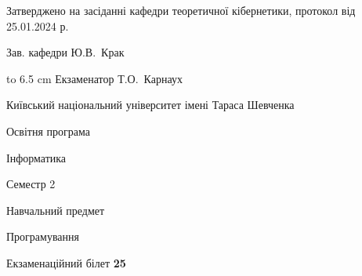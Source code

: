 \documentclass[12pt, ukrainian]{article}
\begin{document}
{\smallskip\smallskip \begin {scriptsize} Затверджено на засіданні кафедри теоретичної кібернетики, протокол   від   25.01.2024 р.\par\smallskip\smallskip\smallskip\smallskip
{\parbox {6.5 cm} {Зав. кафедри \dotfill Ю.В.~Крак}}\hspace {0.7cm} {\hbox to 6.5 cm { Екзаменатор \dotfill Т.О.~Карнаух}} \end{scriptsize}}
\newpage
{{\begin {scriptsize}\par
{ \center  Київський національний університет імені Тараса Шевченка \par}
{\parbox {5 cm}{Освітня програма \hfill}{\parbox {7 cm}{Інформатика\hfill}}\parbox {6 cm}{\hfill Семестр 2}}\par
{\parbox {5 cm} {Навчальний предмет \hfill}\parbox {7 cm}{Програмування \hfill}\parbox {6cm}{\hfill}\par}\vspace{-15pt} \end{scriptsize}}{\center Екзаменаційний білет \No \textbf { 25 }\par}}
\end{document}
